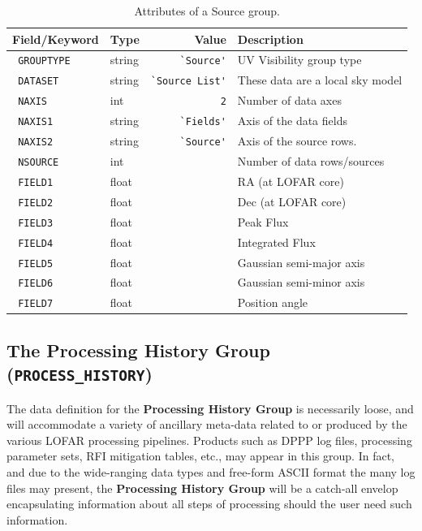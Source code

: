 \documentclass[a4paper,10pt,bibtotoc]{scrartcl}
\begin{document}
\begin{table}[ht]
  \centering
  \begin{tabular}{|llrl|}
    \hline
    \sc Field/Keyword & \sc Type      & \sc Value & \sc Description\\
    \hline \hline                    
    \small{\verb| GROUPTYPE|} & string &\verb|`Source'| & UV Visibility group type \\
    \small{\verb| DATASET|}   & string &\verb|`Source List'|   & These data are a local sky model \\
    \small{\verb| NAXIS|}     & int       &\verb|2|                   & Number of data axes \\
    \small{\verb| NAXIS1|}    & string &\verb|`Fields'|           & Axis of the data fields \\
    \small{\verb| NAXIS2|}    & string &\verb|`Source'|          & Axis of the source rows. \\
    \small{\verb| NSOURCE|}   & int       &               & Number of data rows/sources \\
    \small{\verb| FIELD1|}    & float   &     & RA (at LOFAR core)\\
    \small{\verb| FIELD2|}    & float   &     & Dec (at LOFAR core)\\
    \small{\verb| FIELD3|}    & float   &     & Peak Flux \\
    \small{\verb| FIELD4|}    & float   &     & Integrated Flux \\
    \small{\verb| FIELD5|}    & float   &     & Gaussian semi-major axis \\
    \small{\verb| FIELD6|}    & float   &     & Gaussian semi-minor axis \\
    \small{\verb| FIELD7|}    & float   &     & Position angle \\
    \hline
  \end{tabular}
  \caption{Attributes of a Source group.}
  \label{tab:attributes source group}
\end{table}


\subsection{The Processing History Group ({\tt PROCESS\_HISTORY})}
\label{sec:processing history group}

The data definition for the \textbf{Processing History Group}
is necessarily loose, and will accommodate a variety of ancillary
meta-data related to or produced by the various LOFAR processing
pipelines. Products such as DPPP log files, processing parameter
sets, RFI mitigation tables, etc., may appear in this group.  In fact,
and due to the wide-ranging data types and free-form ASCII format the
many log files may present, the \textbf{Processing History Group} will
be a catch-all envelop encapsulating information about all steps of
processing should the user need such information.
\end{document}
